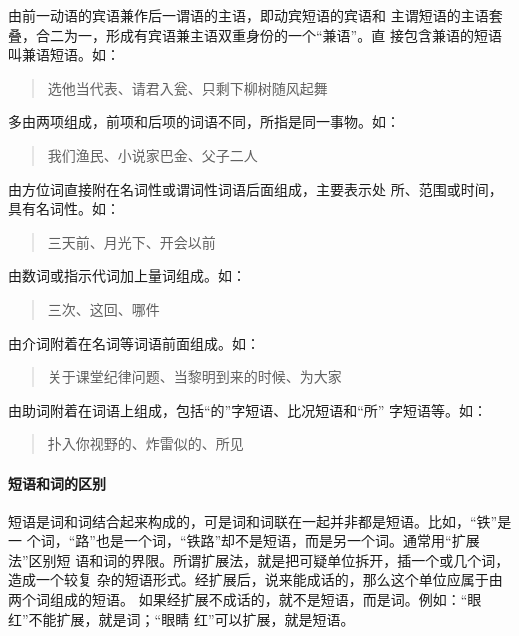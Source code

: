 \documentclass[final,oneside]{ctexbook}
\newenvironment{equotation}{\begin{quotation}\kaishu}{\end{quotation}}
\begin{document}
\begin{description}
  \item[兼语短语]由前一动语的宾语兼作后一谓语的主语，即动宾短语的宾语和
    主谓短语的主语套叠，合二为一，形成有宾语兼主语双重身份的一个“兼语”。直
    接包含兼语的短语叫兼语短语。如：
    \begin{equotation}
      选他当代表、请君入瓮、只剩下柳树随风起舞
    \end{equotation}

  \item[同位短语]多由两项组成，前项和后项的词语不同，所指是同一事物。如：
    \begin{equotation}
      我们渔民、小说家巴金、父子二人
    \end{equotation}

  \item[方位短语]由方位词直接附在名词性或谓词性词语后面组成，主要表示处
    所、范围或时间，具有名词性。如：
    \begin{equotation}
      三天前、月光下、开会以前
    \end{equotation}

  \item[量词短语]由数词或指示代词加上量词组成。如：
    \begin{equotation}
      三次、这回、哪件
    \end{equotation}

  \item[介词短语]由介词附着在名词等词语前面组成。如：
    \begin{equotation}
      关于课堂纪律问题、当黎明到来的时候、为大家
    \end{equotation}

  \item[助词短语]由助词附着在词语上组成，包括“的”字短语、比况短语和“所”
    字短语等。如：
    \begin{equotation}
      扑入你视野的、炸雷似的、所见
    \end{equotation}

\end{description}

\paragraph{短语和词的区别}

短语是词和词结合起来构成的，可是词和词联在一起并非都是短语。比如，“铁”是一
个词，“路”也是一个词，“铁路”却不是短语，而是另一个词。通常用“扩展法”区别短
语和词的界限。所谓扩展法，就是把可疑单位拆开，插一个或几个词，造成一个较复
杂的短语形式。经扩展后，说来能成话的，那么这个单位应属于由两个词组成的短语。
如果经扩展不成话的，就不是短语，而是词。例如：“眼红”不能扩展，就是词；“眼睛
红”可以扩展，就是短语。
\end{document}

